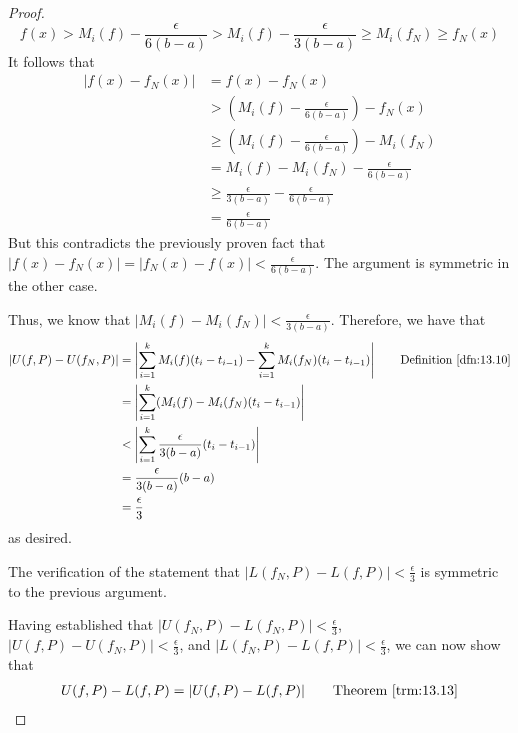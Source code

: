 \documentclass[../main.tex]{subfiles}
\begin{document}
\begin{theorem}
\begin{lemma*}
\begin{proof}
            \begin{equation*}
                f(x) > M_i(f)-\frac{\epsilon}{6(b-a)}
                > M_i(f)-\frac{\epsilon}{3(b-a)}
                \geq M_i(f_N)
                \geq f_N(x)
            \end{equation*}
            It follows that
            \begin{align*}
                |f(x)-f_N(x)| &= f(x)-f_N(x)\\
                &> \left( M_i(f)-\frac{\epsilon}{6(b-a)} \right)-f_N(x)\\
                &\geq \left( M_i(f)-\frac{\epsilon}{6(b-a)} \right)-M_i(f_N)\\
                &= M_i(f)-M_i(f_N)-\frac{\epsilon}{6(b-a)}\\
                &\geq \frac{\epsilon}{3(b-a)}-\frac{\epsilon}{6(b-a)}\\
                &= \frac{\epsilon}{6(b-a)}
            \end{align*}
            But this contradicts the previously proven fact that $|f(x)-f_N(x)|=|f_N(x)-f(x)|<\frac{\epsilon}{6(b-a)}$. The argument is symmetric in the other case.\par
            Thus, we know that $|M_i(f)-M_i(f_N)|<\frac{\epsilon}{3(b-a)}$. Therefore, we have that
            \begin{align*}
                |U(f,P)-U(f_N,P)| &= \left| \sum_{i=1}^kM_i(f)(t_i-t_{i-1})-\sum_{i=1}^kM_i(f_N)(t_i-t_{i-1}) \right|\tag*{Definition \ref{dfn:13.10}}\\
                &= \left| \sum_{i=1}^k(M_i(f)-M_i(f_N)(t_i-t_{i-1}) \right|\\
                &< \left| \sum_{i=1}^k\frac{\epsilon}{3(b-a)}(t_i-t_{i-1}) \right|\\
                &= \frac{\epsilon}{3(b-a)}(b-a)\\
                &= \frac{\epsilon}{3}
            \end{align*}
            as desired.\par\medskip
            The verification of the statement that $|L(f_N,P)-L(f,P)|<\frac{\epsilon}{3}$ is symmetric to the previous argument.\par\medskip
            Having established that $|U(f_N,P)-L(f_N,P)|<\frac{\epsilon}{3}$, $|U(f,P)-U(f_N,P)|<\frac{\epsilon}{3}$, and $|L(f_N,P)-L(f,P)|<\frac{\epsilon}{3}$, we can now show that
            \begin{align*}
                U(f,P)-L(f,P) &= |U(f,P)-L(f,P)|\tag*{Theorem \ref{trm:13.13}}\\

\end{align*}
\end{proof}
\end{lemma*}
\end{theorem}
\end{document}
